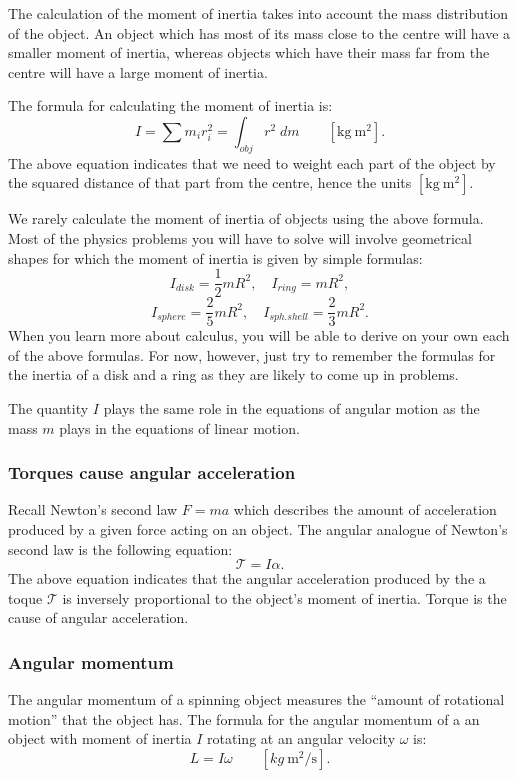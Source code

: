 \documentclass[letterpaper,9pt,journal]{IEEEtran}
\begin{document}
The calculation of the moment of inertia takes into account the mass distribution 
of the object. An object which has most of its mass close to the centre will
have a smaller moment of inertia, whereas objects which have their mass far from
the centre will have a large moment of inertia.

The formula for calculating the moment of inertia is:
\[
 I = \sum m_i r_i^2 = \int_{obj} r^2 \; dm \qquad [\text{kg}\:\text{m}^2].
\]
The above equation indicates that we need to weight each part of the object
by the squared distance of that part from the centre,
hence the units $[\text{kg}\:\text{m}^2]$.

We rarely calculate the moment of inertia of objects using the above formula.
Most of the physics problems you will have to solve will involve 
geometrical shapes for which the moment of inertia is given by simple formulas:
\[
 I_{disk} = \frac{1}{2}mR^2, \quad I_{ring}=mR^2, 
\]
\[
 I_{sphere} = \frac{2}{5} mR^2, \quad I_{sph. shell} = \frac{2}{3} mR^2.
\]
When you learn more about calculus, you will be able to derive on your own
each of the above formulas. For now, however, just try to remember
the formulas for the inertia of a disk and a ring 
as they are likely to come up in problems.

The quantity $I$ plays the same role in the equations of angular motion 
as the mass $m$ plays in the equations of linear motion.


\subsubsection{Torques cause angular acceleration}
Recall Newton's second law $F=ma$ which describes the amount of
acceleration produced by a given force acting on an object.
The angular analogue of Newton's second law is the following equation:
\[
  \mathcal{T} = I \alpha.
\]
The above equation indicates that the angular acceleration produced
by the a toque $\mathcal{T}$ is inversely proportional to the 
object's moment of inertia.
Torque is the cause of angular acceleration.


\subsubsection{Angular momentum}

The angular momentum of a spinning object measures the ``amount of rotational motion''
that the object has.
The formula for the angular momentum of a an object with moment of inertia $I$
rotating at an angular velocity $\omega$ is:
\[
 L = I \omega \qquad [kg\:\text{m}^2/\text{s}].
\]
\end{document}
